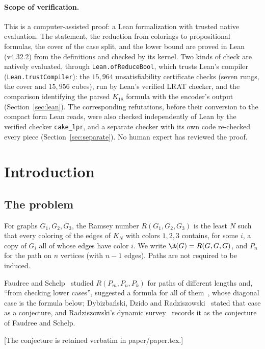 \paragraph{Scope of verification.}
This is a computer-assisted proof: a Lean formalization with trusted
native evaluation. The statement, the reduction from colorings to
propositional formulas, the cover of the case split, and the lower bound
are proved in Lean (v4.32.2) from the definitions and checked by its
kernel. Two kinds of check are natively evaluated, through
\texttt{Lean.ofReduceBool}, which trusts Lean's compiler
(\texttt{Lean.trustCompiler}): the $15{,}964$ unsatisfiability certificate
checks (seven rungs, the cover and $15{,}956$ cubes), run by Lean's
verified LRAT checker, and the comparison identifying the parsed $K_{18}$
formula with the encoder's output (Section~\ref{sec:lean}). The
corresponding refutations, before their conversion to the compact form Lean
reads, were also checked independently of Lean by the verified checker
\texttt{cake\_lpr}, and a separate checker with its own code re-checked
every piece (Section~\ref{sec:separate}). No human expert has reviewed the
proof.

\section{Introduction}\label{sec:intro}

\subsection{The problem}
For graphs $G_1,G_2,G_3$, the Ramsey number $R(G_1,G_2,G_3)$ is the least
$N$ such that every coloring of the edges of $K_N$ with colors $1,2,3$
contains, for some $i$, a copy of $G_i$ all of whose edges have color $i$.
We write $\R(G)=R(G,G,G)$, and $P_n$ for the path on $n$ vertices (with
$n-1$ edges). Paths are not required to be induced.

Faudree and Schelp~\cite{FS75} studied $R(P_m,P_n,P_k)$ for paths of
different lengths and, ``from checking lower cases'', suggested a formula
for all of them~\cite[p.~159]{FS75}, whose diagonal case is the formula
below; Dybizbański, Dzido and Radziszowski~\cite{DDR16}
stated that case as a conjecture, and Radziszowski's dynamic
survey~\cite{Rad26} records it as the conjecture of Faudree and Schelp.

[The conjecture is retained verbatim in paper/paper.tex.]

